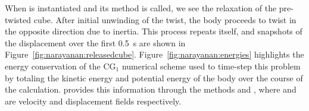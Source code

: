 When  is instantiated and its  method is
called, we see the relaxation of the pre-twisted cube. After initial
unwinding of the twist, the body proceeds to twist in the opposite
direction due to inertia. This process repeats itself, and snapshots
of the displacement over the first 0.5~s are shown in
Figure~\ref{fig:narayanan:releasedcube}. Figure~\ref{fig:narayanan:energies}
highlights the energy conservation of the CG$_{1}$ numerical scheme used
to time-step this problem by totaling the kinetic energy and
potential energy of the body over the course of the
calculation. \twist{} provides this information through the methods
 and , where 
and  are velocity and displacement fields respectively.

\begin{figure}
  \begin{center}
    \\
\end{center}
\end{figure}
